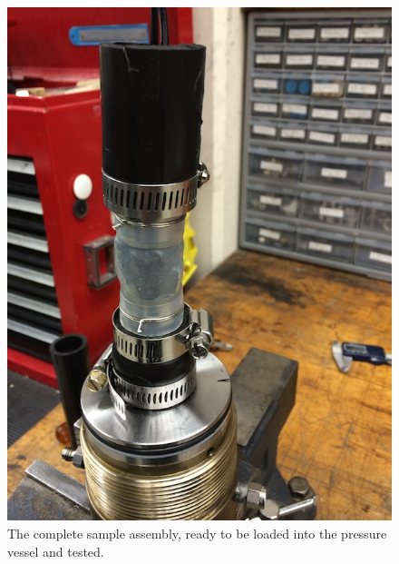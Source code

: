 \begin{figure}
	\centering
        \includegraphics[scale=0.7]{appendix_sample_prep/final_stack.jpg}
   	\caption{The complete sample assembly, ready to be loaded into the pressure vessel and tested.}
  	\label{final_stack}
\end{figure}
